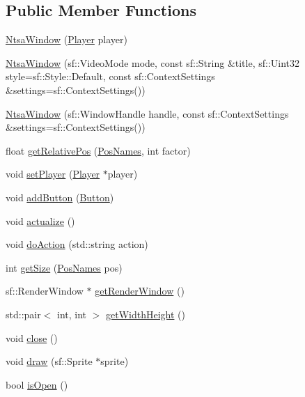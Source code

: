 \subsection*{Public Member Functions}
\begin{DoxyCompactItemize}
\item 
\hyperlink{class_ntsa_window_a12b7135e87d1037a3924a2f5f5799431}{Ntsa\-Window} (\hyperlink{class_player}{Player} player)
\item 
\hyperlink{class_ntsa_window_a1b3f6c3be43c2ecfd108bacb1398f2b0}{Ntsa\-Window} (sf\-::\-Video\-Mode mode, const sf\-::\-String \&title, sf\-::\-Uint32 style=sf\-::\-Style\-::\-Default, const sf\-::\-Context\-Settings \&settings=sf\-::\-Context\-Settings())
\item 
\hyperlink{class_ntsa_window_aeeae6fee36b8479b8925b7f3ba792ed7}{Ntsa\-Window} (sf\-::\-Window\-Handle handle, const sf\-::\-Context\-Settings \&settings=sf\-::\-Context\-Settings())
\item 
float \hyperlink{class_ntsa_window_ac38da02f04c79bc387308a89cd178538}{get\-Relative\-Pos} (\hyperlink{class_ntsa_window_ad45cc5b45dd664a1dd979041e8ab17a3}{Pos\-Names}, int factor)
\item 
void \hyperlink{class_ntsa_window_a37708cfd4792e347f33c03e977475d9e}{set\-Player} (\hyperlink{class_player}{Player} $\ast$player)
\item 
void \hyperlink{class_ntsa_window_ac2991e96dd1dc556961623824ddf682a}{add\-Button} (\hyperlink{class_button}{Button})
\item 
void \hyperlink{class_ntsa_window_aa8d0a7e8928dc1e90a4ca3616218f192}{actualize} ()
\item 
void \hyperlink{class_ntsa_window_ab0b4de4b43e6aa20fc96fbcc0805bad1}{do\-Action} (std\-::string action)
\item 
int \hyperlink{class_ntsa_window_a8504a8160e6c88968662c55ea4587f6c}{get\-Size} (\hyperlink{class_ntsa_window_ad45cc5b45dd664a1dd979041e8ab17a3}{Pos\-Names} pos)
\item 
sf\-::\-Render\-Window $\ast$ \hyperlink{class_ntsa_window_a100372715e96061ae0a06c848e81383f}{get\-Render\-Window} ()
\item 
std\-::pair$<$ int, int $>$ \hyperlink{class_ntsa_window_a04b0c18abd4bbe4a1785c633e17be351}{get\-Width\-Height} ()
\item 
void \hyperlink{class_ntsa_window_a2ed76648e64d49378d9107eadd65feec}{close} ()
\item 
void \hyperlink{class_ntsa_window_ab7f78dc06beb1fe676b21838f4f059e6}{draw} (sf\-::\-Sprite $\ast$sprite)
\item 
bool \hyperlink{class_ntsa_window_ad6b3a6571aeb24840953695a5ada4f42}{is\-Open} ()
\end{DoxyCompactItemize}
